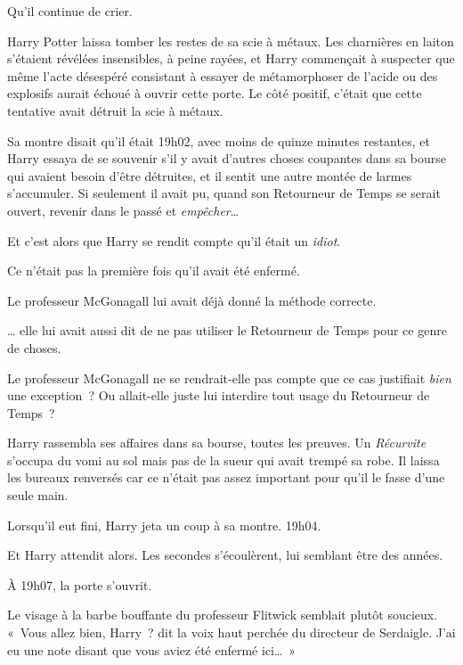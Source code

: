 Qu'il continue de crier.

\later

Harry Potter laissa tomber les restes de sa scie à métaux. Les charnières en laiton s'étaient révélées insensibles, à peine rayées, et Harry commençait à suspecter que même l'acte désespéré consistant à essayer de métamorphoser de l'acide ou des explosifs aurait échoué à ouvrir cette porte. Le côté positif, c'était que cette tentative avait détruit la scie à métaux.

Sa montre disait qu'il était 19h02, avec moins de quinze minutes restantes, et Harry essaya de se souvenir s'il y avait d'autres choses coupantes dans sa bourse qui avaient besoin d'être détruites, et il sentit une autre montée de larmes s'accumuler. Si seulement il avait pu, quand son Retourneur de Temps se serait ouvert, revenir dans le passé et \emph{empêcher}…

Et c'est alors que Harry se rendit compte qu'il était un \emph{idiot}.

Ce n'était pas la première fois qu'il avait été enfermé.

Le professeur McGonagall lui avait déjà donné la méthode correcte.

… elle lui avait aussi dit de ne pas utiliser le Retourneur de Temps pour ce genre de choses.

Le professeur McGonagall ne se rendrait-elle pas compte que ce cas justifiait \emph{bien} une exception~? Ou allait-elle juste lui interdire tout usage du Retourneur de Temps~?

Harry rassembla ses affaires dans sa bourse, toutes les preuves. Un \emph{Récurvite} s'occupa du vomi au sol mais pas de la sueur qui avait trempé sa robe. Il laissa les bureaux renversés car ce n'était pas assez important pour qu'il le fasse d'une seule main.

Lorsqu'il eut fini, Harry jeta un coup à sa montre. 19h04.

Et Harry attendit alors. Les secondes s'écoulèrent, lui semblant être des années.

À 19h07, la porte s'ouvrit.

Le visage à la barbe bouffante du professeur Flitwick semblait plutôt soucieux. «~Vous allez bien, Harry~? dit la voix haut perchée du directeur de Serdaigle. J'ai eu une note disant que vous aviez été enfermé ici…~»
